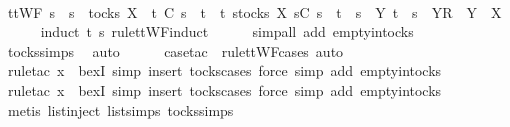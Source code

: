 \ \ \isamarkupfalse%
\ \isamarkupfalse%
\ {\isachardoublequoteopen}ttWF\ s\ {\isasymlongrightarrow}\ s\ {\isasymin}\ tocks\ X\ {\isasymlongrightarrow}\ t\ {\isasymlesssim}\isactrlsub C\ s\ {\isasymlongrightarrow}\ t\ {\isasymin}\ {\isacharbraceleft}t{\isachardot}\ {\isasymexists}s{\isacharprime}{\isasymin}tocks\ X{\isachardot}\ s{\isacharprime}{\isasymlesssim}\isactrlsub C\ s\ {\isasymand}\ {\isacharparenleft}t\ {\isacharequal}\ s{\isacharprime}\ {\isasymor}\ {\isacharparenleft}{\isasymexists}Y{\isachardot}\ t\ {\isacharequal}\ s{\isacharprime}\ {\isacharat}\ {\isacharbrackleft}{\isacharbrackleft}Y{\isacharbrackright}\isactrlsub R{\isacharbrackright}\ {\isasymand}\ Y\ {\isasymsubseteq}\ X{\isacharparenright}{\isacharparenright}{\isacharbraceright}{\isachardoublequoteclose}\isanewline
\ \ \ \ \isamarkupfalse%
\ {\isacharparenleft}induct\ t\ s\ rule{\isacharcolon}ttWF{}{\isachardot}induct{\isacharparenright}\isanewline
\ \ \ \ \isamarkupfalse%
\ {\isacharparenleft}simp{\isacharunderscore}all\ add{\isacharcolon}\ empty{\isacharunderscore}in{\isacharunderscore}tocks{\isacharparenright}\isanewline
\ \ \ \ \isamarkupfalse%
\ tocks{\isachardot}simps\ \isamarkupfalse%
\ auto{\isacharbrackleft}{}{\isacharbrackright}\isanewline
\ \ \ \ \isamarkupfalse%
\ {\isacharparenleft}case{\isacharunderscore}tac\ {\isasymsigma}\ rule{\isacharcolon}ttWF{\isachardot}cases{\isacharcomma}\ auto{\isacharparenright}\isanewline
\ \ \ \ \isamarkupfalse%
\ {\isacharparenleft}rule{\isacharunderscore}tac\ x{\isacharequal}{\isachardoublequoteopen}{\isacharbrackleft}{\isacharbrackright}{\isachardoublequoteclose}\ \ bexI{\isacharcomma}\ simp{\isacharcomma}\ insert\ tocks{\isachardot}cases{\isacharcomma}\ force{\isacharcomma}\ simp\ add{\isacharcolon}\ empty{\isacharunderscore}in{\isacharunderscore}tocks{\isacharparenright}\isanewline
\ \ \ \ \isamarkupfalse%
\ {\isacharparenleft}rule{\isacharunderscore}tac\ x{\isacharequal}{\isachardoublequoteopen}{\isacharbrackleft}{\isacharbrackright}{\isachardoublequoteclose}\ \ bexI{\isacharcomma}\ simp{\isacharcomma}\ insert\ tocks{\isachardot}cases{\isacharcomma}\ force{\isacharcomma}\ simp\ add{\isacharcolon}\ empty{\isacharunderscore}in{\isacharunderscore}tocks{\isacharparenright}\isanewline
\ \ \ \ \isamarkupfalse%
\ {\isacharparenleft}metis\ list{\isachardot}inject\ list{\isachardot}simps{\isacharparenleft}{}{\isacharparenright}\ tocks{\isachardot}simps{\isacharparenright}\isanewline
